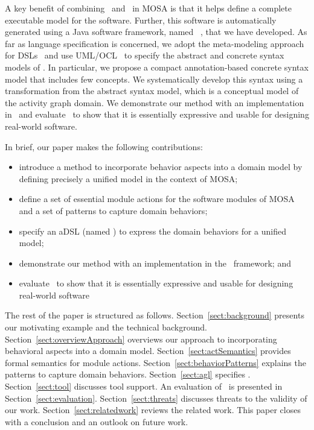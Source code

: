 A key benefit of combining \dcsl~and \agl~in MOSA is that it helps define a complete executable model for the software. Further, this software is automatically generated using a Java software framework, named \jdomainapp~\cite{le_jdomainapp_2017}, that we have developed.
%
As far as language specification is concerned, we adopt the meta-modeling approach for DSLs~\cite{kleppe_software_2008} and use UML/OCL~\cite{omg_unified_2015, omg_object_2014} to specify the abstract and concrete syntax models of \agl. In particular, we propose a compact annotation-based concrete syntax model that includes few concepts. We systematically develop this syntax using a transformation from the abstract syntax model, which is a conceptual model of the activity graph domain.
%
We demonstrate our method with an implementation in \jdomainapp~and evaluate \agl~to show that it is essentially expressive and usable for designing real-world software. 

In brief, our paper makes the following contributions:
%
\begin{itemize}[leftmargin=*]
	\item introduce a method to incorporate behavior aspects into a domain model by defining precisely a unified model in the context of MOSA;
	\item define a set of essential module actions for the software modules of MOSA and a set of patterns to capture domain behaviors;
	\item specify an aDSL (named \agl) to express the domain behaviors for a unified model;
	\item demonstrate our method with an implementation in the \jdomainapp~framework; and
  \item evaluate \agl~to show that it is essentially expressive and usable for designing real-world software
\end{itemize}

The rest of the paper is structured as follows. Section~\ref{sect:background} presents our motivating example and the technical background. 
Section~\ref{sect:overviewApproach} overviews our approach to incorporating behavioral aspects into a domain model. 
Section~\ref{sect:actSemantics} provides formal semantics for module actions. Section~\ref{sect:behaviorPatterns} explains the patterns to capture domain behaviors.  
Section~\ref{sect:agl} specifies \agl. 
Section~\ref{sect:tool} discusses tool support.
An evaluation of \agl~is presented in Section~\ref{sect:evaluation}. Section~\ref{sect:threats} discusses threats to the validity of our work.
Section~\ref{sect:relatedwork} reviews the related work. This paper closes with a conclusion and an outlook on future work.

